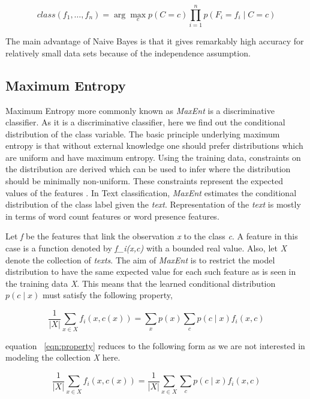 \begin{equation}
class(f_1,\dots,f_n) = \arg\max_c p(C=c) \prod_{i=1}^{n} p(F_i = f_i \mid C=c) 
\end{equation}

\par
The main advantage of Naive Bayes is that it gives remarkably high accuracy for relatively small data sets because of the independence
assumption. 

\subsection{Maximum Entropy}
\par
Maximum Entropy more commonly known as \textit{MaxEnt} is a discriminative classifier. As it is a discriminative classifier, here we find out 
the conditional distribution of the class variable. The basic principle underlying maximum entropy is that without external knowledge
one should prefer distributions which are uniform and have maximum entropy. Using the training data, constraints on the distribution 
are derived which can be used to infer where the distribution should be minimally non-uniform. These constraints represent the expected
values of the features \citep*{nigam1999using}. In Text classification, \textit{MaxEnt} estimates the conditional distribution of the class label
given the \textit{text}. Representation of the \textit{text} is mostly in terms of word count features or word presence features.

 
Let \textit{f} be the features that link the observation \textit{x} to the class \textit{c}. A feature in this case is a function denoted
by \textit{f_i(x,c)} with a bounded real value. Also, let \textit{X} denote the collection of \textit{texts}. The aim of \textit{MaxEnt} is to
restrict the model distribution to have the same expected value for each such feature as is seen in the training data \textit{X}. 
This means that the learned conditional distribution \(p(c \mid x)\) must satisfy the following property, 

\begin{equation}\label{eqn:property}
 \frac{1}{|X|} \sum_{x \in X} f_i(x, c(x)) = \sum_x p(x) \sum_c p(c \mid x)f_i(x,c)
\end{equation}

equation ~\ref{eqn:property} reduces to the following form as we are not interested in modeling the collection \textit{X} here.

\begin{equation}\label{eqn:newproperty}
 \frac{1}{|X|} \sum_{x \in X} f_i(x, c(x)) = \frac{1}{|X|} \sum_{x \in X} \sum_c p(c \mid x)f_i(x,c)
\end{equation}

